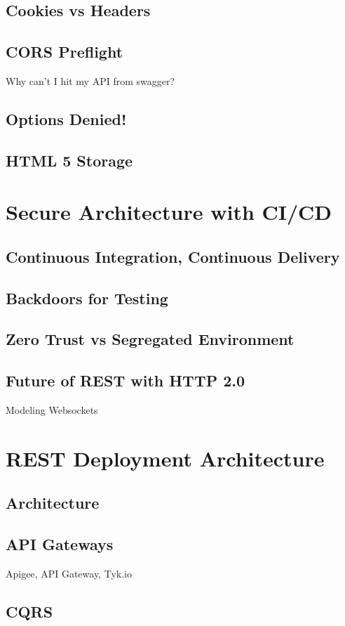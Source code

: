 \documentclass[12pt,oneside]{book} %
\begin{document}
\section{Cookies vs Headers}
\section{CORS Preflight}
Why can't I hit my API from swagger?

\section{Options Denied!}
\section{HTML 5 Storage}

\chapter{Secure Architecture with CI/CD}
\section{Continuous Integration, Continuous Delivery}
\section{Backdoors for Testing}
\section{Zero Trust vs Segregated Environment}
\section{Future of REST with HTTP 2.0}
Modeling Websockets

\chapter{REST Deployment Architecture}
\section{Architecture}
\section{API Gateways}
Apigee, API Gateway, Tyk.io
\section{CQRS}
\end{document}
